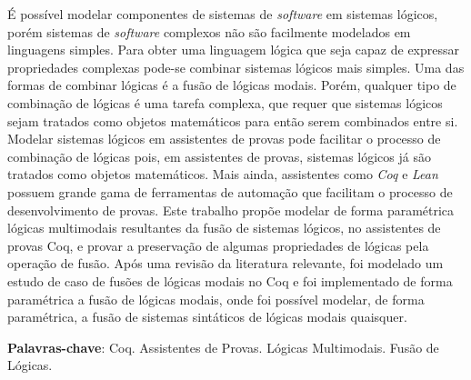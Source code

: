 
\setlength{\absparsep}{18pt} %
\begin{resumo}
    É possível modelar componentes de sistemas de \textit{software} em sistemas lógicos,
    porém sistemas de \textit{software} complexos não são facilmente modelados em linguagens simples.
    Para obter uma linguagem lógica que seja capaz de expressar propriedades complexas pode-se combinar sistemas lógicos mais simples.
    Uma das formas de combinar lógicas é a fusão de lógicas modais. Porém, qualquer tipo de combinação de lógicas é uma tarefa complexa, que requer
    que sistemas lógicos sejam tratados como objetos matemáticos para então serem combinados entre si. Modelar sistemas lógicos
    em assistentes de provas pode facilitar o processo de combinação de lógicas pois, em assistentes de provas, sistemas lógicos já são tratados
    como objetos matemáticos. Mais ainda, assistentes como \textit{Coq} e \textit{Lean} possuem grande gama de ferramentas de automação
    que facilitam o processo de desenvolvimento de provas.
    Este trabalho propõe modelar de forma paramétrica lógicas multimodais resultantes da fusão de sistemas lógicos,
    no assistentes de provas Coq, e provar a preservação de algumas propriedades de lógicas pela operação de fusão.
    Após uma revisão da literatura relevante, foi modelado um estudo de caso de fusões de lógicas modais no Coq e foi implementado de forma
    paramétrica a fusão de lógicas modais, onde foi possível modelar, de forma paramétrica, a fusão de sistemas sintáticos de lógicas modais quaisquer.

 \textbf{Palavras-chave}: Coq. Assistentes de Provas. Lógicas Multimodais. Fusão de Lógicas.
\end{resumo}

